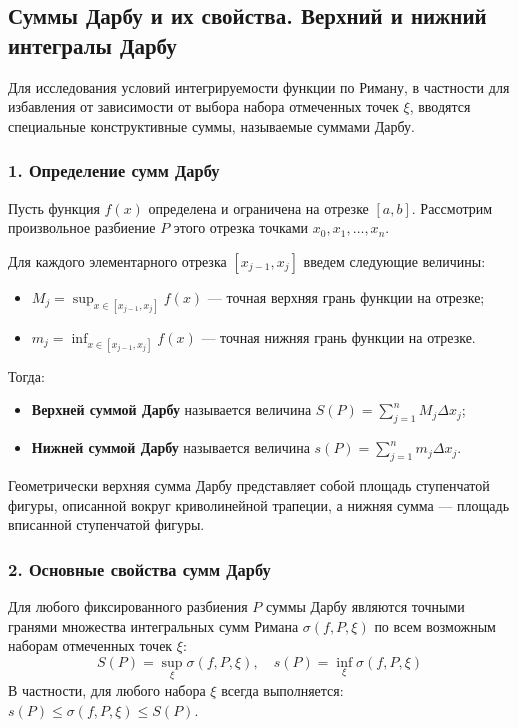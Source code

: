\subsection{Суммы Дарбу и их свойства. Верхний и нижний интегралы Дарбу}

Для исследования условий интегрируемости функции по Риману, в частности для избавления от зависимости от выбора набора отмеченных точек $\xi$, вводятся специальные конструктивные суммы, называемые суммами Дарбу.

\subsubsection*{1. Определение сумм Дарбу}

Пусть функция $f(x)$ определена и ограничена на отрезке $[a, b]$. Рассмотрим произвольное разбиение $P$ этого отрезка точками $x_0, x_1, \dots, x_n$.

\begin{definition}
Для каждого элементарного отрезка $[x_{j-1}, x_j]$ введем следующие величины:
\begin{itemize}
    \item $M_j = \sup_{x \in [x_{j-1}, x_j]} f(x)$ — точная верхняя грань функции на отрезке;
    \item $m_j = \inf_{x \in [x_{j-1}, x_j]} f(x)$ — точная нижняя грань функции на отрезке.
\end{itemize}
Тогда:
\begin{itemize}
    \item \textbf{Верхней суммой Дарбу} называется величина $S(P) = \sum_{j=1}^n M_j \Delta x_j$;
    \item \textbf{Нижней суммой Дарбу} называется величина $s(P) = \sum_{j=1}^n m_j \Delta x_j$.
\end{itemize}
\end{definition}

Геометрически верхняя сумма Дарбу представляет собой площадь ступенчатой фигуры, описанной вокруг криволинейной трапеции, а нижняя сумма — площадь вписанной ступенчатой фигуры.

\subsubsection*{2. Основные свойства сумм Дарбу}

\begin{theorem}
Для любого фиксированного разбиения $P$ суммы Дарбу являются точными гранями множества интегральных сумм Римана $\sigma(f, P, \xi)$ по всем возможным наборам отмеченных точек $\xi$:
\[ S(P) = \sup_{\xi} \sigma(f, P, \xi), \quad s(P) = \inf_{\xi} \sigma(f, P, \xi) \]
В частности, для любого набора $\xi$ всегда выполняется: $s(P) \le \sigma(f, P, \xi) \le S(P)$.
\end{theorem}

